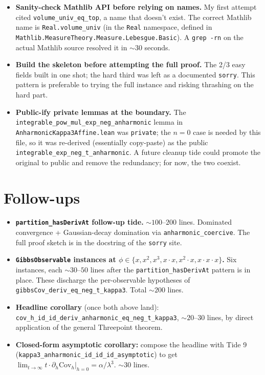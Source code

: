 \documentclass[11pt]{article}
\begin{document}
\begin{itemize}[noitemsep,leftmargin=*]
\item \textbf{Sanity-check Mathlib API before relying on names.} My
  first attempt cited \texttt{volume\_univ\_eq\_top}, a name that
  doesn't exist. The correct Mathlib name is \texttt{Real.volume\_univ}
  (in the \texttt{Real} namespace, defined in
  \texttt{Mathlib.MeasureTheory.Measure.Lebesgue.Basic}). A
  \texttt{grep -rn} on the actual Mathlib source resolved it in
  $\sim 30$ seconds.

\item \textbf{Build the skeleton before attempting the full proof.}
  The 2/3 easy fields built in one shot; the hard third was left
  as a documented \texttt{sorry}. This pattern is preferable to
  trying the full instance and risking thrashing on the hard part.

\item \textbf{Public-ify private lemmas at the boundary.} The
  \texttt{integrable\_pow\_mul\_exp\_neg\_anharmonic} lemma in
  \texttt{AnharmonicKappa3Affine.lean} was \texttt{private}; the
  $n=0$ case is needed by this file, so it was re-derived
  (essentially copy-paste) as the public
  \texttt{integrable\_exp\_neg\_t\_anharmonic}. A future cleanup
  tide could promote the original to public and remove the
  redundancy; for now, the two coexist.
\end{itemize}

\section{Follow-ups}

\begin{itemize}[noitemsep,leftmargin=*]
\item \textbf{\texttt{partition\_hasDerivAt} follow-up tide.}
  $\sim 100$--$200$ lines. Dominated convergence + Gaussian-decay
  domination via \texttt{anharmonic\_coercive}. The full proof
  sketch is in the docstring of the \texttt{sorry} site.
\item \textbf{\texttt{GibbsObservable} instances at $\phi \in
  \{x, x^2, x^3, x \cdot x, x^2 \cdot x, x \cdot x \cdot x\}$.}
  Six instances, each $\sim 30$--$50$ lines after the
  \texttt{partition\_hasDerivAt} pattern is in place. These
  discharge the per-observable hypotheses of
  \texttt{gibbsCov\_deriv\_eq\_neg\_t\_kappa3}. Total $\sim 200$
  lines.
\item \textbf{Headline corollary} (once both above land):
  \texttt{cov\_h\_id\_id\_deriv\_anharmonic\_eq\_neg\_t\_kappa3},
  $\sim 20$--$30$ lines, by direct application of the general
  Threepoint theorem.
\item \textbf{Closed-form asymptotic corollary:} compose the
  headline with Tide 9
  (\texttt{kappa3\_anharmonic\_id\_id\_id\_asymptotic}) to get
  $\lim_{t \to \infty} t \cdot \partial_h \mathrm{Cov}_h|_{h=0} = \alpha/\lambda^3$.
  $\sim 30$ lines.
\end{itemize}
\end{document}
